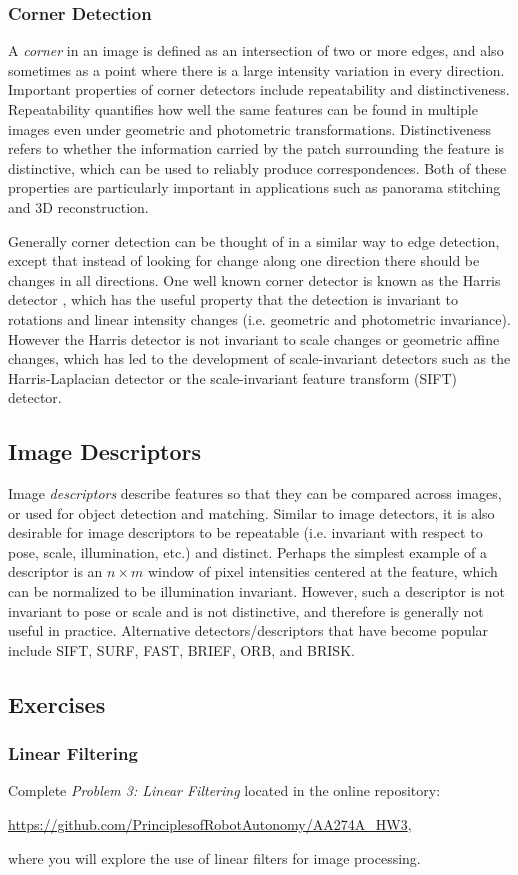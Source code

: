 \subsubsection{Corner Detection}
A \textit{corner} in an image is defined as an intersection of two or more edges, and also sometimes as a point where there is a large intensity variation in every direction. 
Important properties of corner detectors include repeatability and distinctiveness. Repeatability quantifies how well the same features can be found in multiple images even under geometric and photometric transformations. Distinctiveness refers to whether the information carried by the patch surrounding the feature is distinctive, which can be used to reliably produce correspondences. Both of these properties are particularly important in applications such as panorama stitching and 3D reconstruction.

Generally corner detection can be thought of in a similar way to edge detection, except that instead of looking for change along one direction there should be changes in all directions. One well known corner detector is known as the Harris detector \cite{Harris1988}, which has the useful property that the detection is invariant to rotations and linear intensity changes (i.e. geometric and photometric invariance). However the Harris detector is not invariant to scale changes or geometric affine changes, which has led to the development of scale-invariant detectors such as the Harris-Laplacian detector or the scale-invariant feature transform (SIFT) detector.

\subsection{Image Descriptors}
Image \textit{descriptors} describe features so that they can be compared across images, or used for object detection and matching. Similar to image detectors, it is also desirable for image descriptors to be repeatable (i.e. invariant with respect to pose, scale, illumination, etc.) and distinct. Perhaps the simplest example of a descriptor is an $n\times m$ window of pixel intensities centered at the feature, which can be normalized to be illumination invariant. However, such a descriptor is not invariant to pose or scale and is not distinctive, and therefore is generally not useful in practice. 
Alternative detectors/descriptors that have become popular include SIFT, SURF, FAST, BRIEF, ORB, and BRISK. 

\subsection{Exercises}
\subsubsection{Linear Filtering}
Complete \textit{Problem 3: Linear Filtering} located in the online repository:

\vspace{\baselineskip}

\url{https://github.com/PrinciplesofRobotAutonomy/AA274A_HW3},

\vspace{\baselineskip}

where you will explore the use of linear filters for image processing.